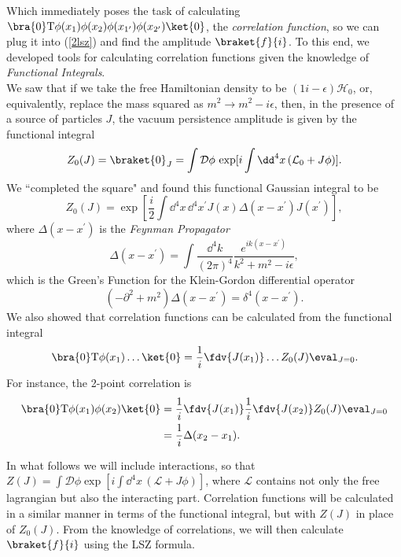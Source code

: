 Which immediately poses the task of calculating $\bra{0}\text{T}\phi(x_1)\phi(x_2)\phi(x_{1^\prime})\phi(x_{2^\prime})\ket{0}$, the \textit{correlation function},  so we can plug it into (\ref{2lsz}) and find the amplitude $\braket{f}{i}$. To this end, we developed tools for calculating correlation functions given the knowledge of \textit{Functional Integrals}.\\

We saw that if we take the free Hamiltonian density to be $(1i-\epsilon)\mathcal{H}_0$, or, equivalently, replace the mass squared as $m^2\to m^2-i\epsilon$, then, in the presence of a source of particles $J$, the vacuum persistence amplitude is given by the functional integral
\begin{equation}
    Z_0(J)=\braket{0}_J=\int\mathcal{D}\phi\,\exp[i\int\dd^4x\,(\mathcal{L}_0+J\phi)].
\end{equation}
We ``completed the square" and found this functional Gaussian integral to be
\begin{equation}
    Z_0(J)=\exp[\frac{i}{2}\int\dd^4x\,\dd^4x^\prime J(x)\Delta(x-x^\prime)J(x^\prime)],
\end{equation}
where $\Delta(x-x^\prime)$ is the \textit{Feynman Propagator}
\begin{equation}
    \Delta(x-x^\prime)=\int\frac{\dd^4k}{(2\pi)^4}\frac{e^{ik(x-x^\prime)}}{k^2+m^2-i\epsilon},
    \label{feynman_propagator_spacetime}
\end{equation}
which is the Green's Function for the Klein-Gordon differential operator
\begin{equation}
    (-\partial^2+m^2)\Delta(x-x^\prime)=\delta^4(x-x^\prime).
    \label{greens_kg}
\end{equation}
We also showed that correlation functions can be calculated from the functional integral
\begin{equation}
    \bra{0}\text{T}\phi(x_1)\dots\ket{0}=\frac{1}{i}\fdv{J(x_1)}\dots Z_0(J)\eval_{J=0}.
    \label{corr_general}
\end{equation}
For instance, the 2-point correlation is
\begin{equation}
    \begin{aligned}
    \bra{0}\text{T}\phi(x_1)\phi(x_2)\ket{0}&=\frac{1}{i}\fdv{J(x_1)}\frac{1}{i}\fdv{J(x_2)}Z_0(J)\eval_{J=0}\\
    &=\frac{1}{i}\Delta(x_2-x_1).
\end{aligned}
\end{equation}

In what follows we will include interactions, so that $Z(J)=\int\mathcal{D}\phi\exp[i\int\dd^4x\,(\mathcal{L}+J\phi)]$, where $\mathcal{L}$ contains not only the free lagrangian but also the interacting part. Correlation functions will be calculated in a similar manner in terms of the functional integral, but with $Z(J)$ in place of $Z_0(J)$. From the knowledge of correlations, we will then calculate $\braket{f}{i}$ using the LSZ formula.